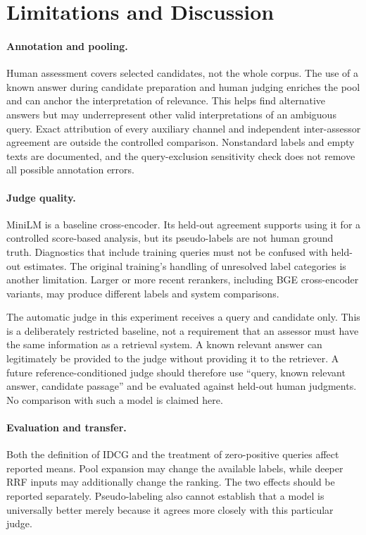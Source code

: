 \documentclass[runningheads,a4paper]{llncs}
\begin{document}
\section{Limitations and Discussion}
\label{sec:discussion}

\paragraph{Annotation and pooling.}
Human assessment covers selected candidates, not the whole corpus. The use of a known answer during candidate preparation and human judging enriches the pool and can anchor the interpretation of relevance. This helps find alternative answers but may underrepresent other valid interpretations of an ambiguous query. Exact attribution of every auxiliary channel and independent inter-assessor agreement are outside the controlled comparison. Nonstandard labels and empty texts are documented, and the query-exclusion sensitivity check does not remove all possible annotation errors.

\paragraph{Judge quality.}
MiniLM is a baseline cross-encoder. Its held-out agreement supports using it for a controlled score-based analysis, but its pseudo-labels are not human ground truth. Diagnostics that include training queries must not be confused with held-out estimates. The original training's handling of unresolved label categories is another limitation. Larger or more recent rerankers, including BGE cross-encoder variants, may produce different labels and system comparisons.

The automatic judge in this experiment receives a query and candidate only. This is a deliberately restricted baseline, not a requirement that an assessor must have the same information as a retrieval system. A known relevant answer can legitimately be provided to the judge without providing it to the retriever. A future reference-conditioned judge should therefore use ``query, known relevant answer, candidate passage'' and be evaluated against held-out human judgments. No comparison with such a model is claimed here.

\paragraph{Evaluation and transfer.}
Both the definition of IDCG and the treatment of zero-positive queries affect reported means. Pool expansion may change the available labels, while deeper RRF inputs may additionally change the ranking. The two effects should be reported separately. Pseudo-labeling also cannot establish that a model is universally better merely because it agrees more closely with this particular judge.
\end{document}
